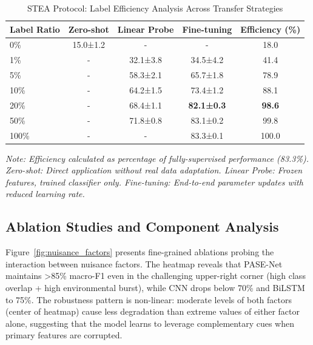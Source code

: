 \documentclass[journal]{IEEEtran}
\begin{document}
\begin{table}[t]
\centering
\caption{STEA Protocol: Label Efficiency Analysis Across Transfer Strategies}
\label{tab:stea_results}
\small
\begin{tabular}{@{}lcccc@{}}
\toprule
\textbf{Label Ratio} & \textbf{Zero-shot} & \textbf{Linear Probe} & \textbf{Fine-tuning} & \textbf{Efficiency (\%)} \\
\midrule
0\% & 15.0±1.2 & - & - & 18.0 \\
1\% & - & 32.1±3.8 & 34.5±4.2 & 41.4 \\
5\% & - & 58.3±2.1 & 65.7±1.8 & 78.9 \\
10\% & - & 64.2±1.5 & 73.4±1.2 & 88.1 \\
20\% & - & 68.4±1.1 & \textbf{82.1±0.3} & \textbf{98.6} \\
50\% & - & 71.8±0.8 & 83.1±0.2 & 99.8 \\
100\% & - & - & 83.3±0.1 & 100.0 \\
\bottomrule
\end{tabular}
\end{table}
\textit{Note: Efficiency calculated as percentage of fully-supervised performance (83.3\%). Zero-shot: Direct application without real data adaptation. Linear Probe: Frozen features, trained classifier only. Fine-tuning: End-to-end parameter updates with reduced learning rate.}


\subsection{Ablation Studies and Component Analysis}

Figure~\ref{fig:nuisance_factors} presents fine-grained ablations probing the interaction between nuisance factors. The heatmap reveals that PASE-Net maintains >85\% macro-F1 even in the challenging upper-right corner (high class overlap + high environmental burst), while CNN drops below 70\% and BiLSTM to 75\%. The robustness pattern is non-linear: moderate levels of both factors (center of heatmap) cause less degradation than extreme values of either factor alone, suggesting that the model learns to leverage complementary cues when primary features are corrupted.
\end{document}
